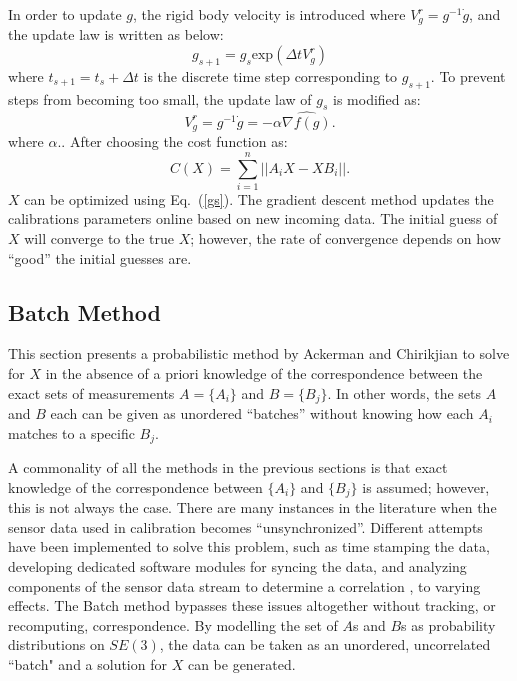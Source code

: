 \documentclass[twocolumn,10pt]{asme2ej}
\begin{document}
In order to update $g$, the rigid body velocity is introduced where $V^{r}_{g} = g^{-1}\dot{g}$, and the update law is written as below:
\begin{equation}
g_{s+1} = g_{s}\text{exp}(\Delta t V^{r}_{g})
\end{equation}
where $t_{s+1} = t_{s} + \Delta t$ is the discrete time step corresponding to $g_{s+1}$. To prevent steps from becoming too small, the update law of $g_s$ is modified as:%
\begin{equation}
V^{r}_{g} = g^{-1}\dot{g} = -\alpha \widehat{\nabla f(g)}.
\label{gs}
\end{equation} 
where $\alpha..$
After choosing the cost function as:
\begin{equation}
C(X) = \sum_{i=1}^{n}||A_{i}X - XB_{i}||.
\end{equation}
$X$ can be optimized using Eq.~(\ref{gs}).
The gradient descent method updates the calibrations parameters online based on new incoming data. The initial guess of $X$ will converge to the true $X$; however, the rate of convergence depends on how ``good'' the initial guesses are.


\subsection{Batch Method}
\label{batchnoisefree}
This section presents a probabilistic method \cite{ackermanGSI} by Ackerman and Chirikjian to solve for $X$ in the absence of %
a priori knowledge of the correspondence between the exact sets of measurements
$A = \{A_i\}$ and $B = \{B_j\}$. In other words, the sets $A$ and $B$ each can be given as unordered ``batches'' without knowing how each $A_i$ matches to a specific $B_j$.

A commonality of all the methods in the previous sections is that exact knowledge of the correspondence between $\{A_i\}$ and $\{B_j\}$ is assumed; however, this is not always the case. There are many instances in the literature when the sensor data used in calibration becomes ``unsynchronized''. Different attempts have been implemented to solve this problem, such as time stamping the data, developing dedicated software modules for syncing the data, and analyzing components of the sensor data stream to determine a correlation \cite{darius1}, to varying effects. The Batch method bypasses these issues altogether without tracking, or recomputing, correspondence. By modelling the set of $A$s and $B$s as probability distributions on $SE(3)$, the data can be taken as an unordered, uncorrelated ``batch" and a solution for $X$ can be generated.
\end{document}
